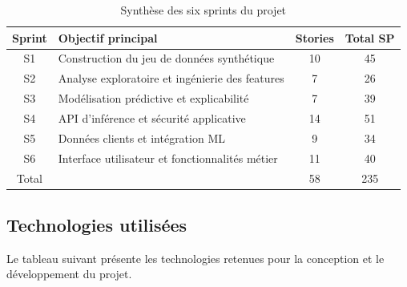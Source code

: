 \begin{table}[H]
\centering
\caption{Synthèse des six sprints du projet}
\label{tab:recap_sprints}
\begin{tabular}{|c|p{7cm}|c|c|}
\hline
Sprint & Objectif principal & Stories & Total SP \\
\hline
S1 & Construction du jeu de données synthétique & 10 & 45 \\
\hline
S2 & Analyse exploratoire et ingénierie des features & 7 & 26 \\
\hline
S3 & Modélisation prédictive et explicabilité & 7 & 39 \\
\hline
S4 & API d'inférence et sécurité applicative & 14 & 51 \\
\hline
S5 & Données clients et intégration ML & 9 & 34 \\
\hline
S6 & Interface utilisateur et fonctionnalités métier & 11 & 40 \\
\hline
Total & & 58 & 235 \\
\hline
\end{tabular}
\end{table}

\subsection{Technologies utilisées}

Le tableau suivant présente les technologies retenues pour la conception et le développement du projet.


